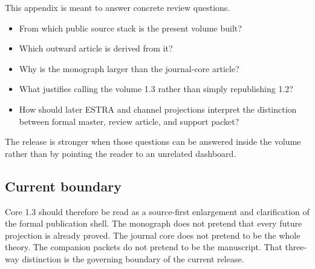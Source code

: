 This appendix is meant to answer concrete review questions.

\begin{itemize}
\item From which public source stack is the present volume built?
\item Which outward article is derived from it?
\item Why is the monograph larger than the journal-core article?
\item What justifies calling the volume 1.3 rather than simply republishing 1.2?
\item How should later ESTRA and channel projections interpret the distinction between formal
      master, review article, and support packet?
\end{itemize}

The release is stronger when those questions can be answered inside the volume rather than by
pointing the reader to an unrelated dashboard.

\subsection{Current boundary}

Core 1.3 should therefore be read as a source-first enlargement and clarification of the formal
publication shell.
The monograph does not pretend that every future projection is already proved.
The journal core does not pretend to be the whole theory.
The companion packets do not pretend to be the manuscript.
That three-way distinction is the governing boundary of the current release.
